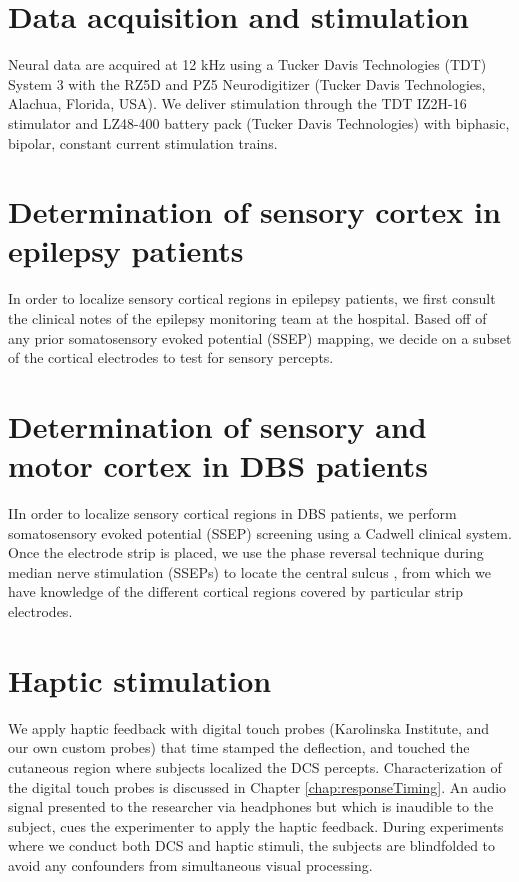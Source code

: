 \section{Data acquisition and stimulation}

Neural data are acquired at 12 kHz using a Tucker Davis Technologies (TDT) System 3 with the RZ5D and PZ5 Neurodigitizer (Tucker Davis Technologies, Alachua, Florida, USA). We deliver stimulation through the TDT IZ2H-16 stimulator and LZ48-400 battery pack (Tucker Davis Technologies) with biphasic, bipolar, constant current stimulation trains. 

\section{Determination of sensory cortex in epilepsy patients}

In order to localize sensory cortical regions in epilepsy patients, we first consult the clinical notes of the epilepsy monitoring team at the hospital. Based off of any prior somatosensory evoked potential (SSEP) mapping, we decide on a subset of the cortical electrodes to test for sensory percepts. 

\section{Determination of sensory and motor cortex in DBS patients  }

IIn order to localize sensory cortical regions in DBS patients, we perform somatosensory evoked potential (SSEP) screening using a Cadwell clinical system.  Once the electrode strip is placed, we use the phase reversal technique during median nerve stimulation (SSEPs) to locate the central sulcus \cite{Cedzich1996a}, from which we have knowledge of the different cortical regions covered by particular strip electrodes. 

\section{Haptic stimulation}

We apply haptic feedback with digital touch probes (Karolinska Institute, and our own custom probes) that time stamped the deflection, and touched the cutaneous region where subjects localized the DCS percepts. Characterization of the digital touch probes is discussed in Chapter \ref{chap:responseTiming}. An audio signal presented to the researcher via headphones but which is inaudible to the subject, cues the experimenter to apply the haptic feedback. During experiments where we conduct both DCS and haptic stimuli, the subjects are blindfolded to avoid any confounders from simultaneous visual processing. 



